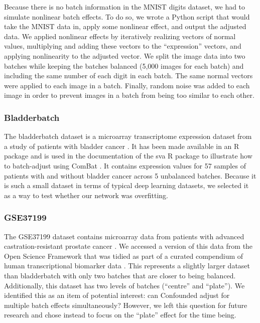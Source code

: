 \documentclass[notitlepage]{article}
\begin{document}
Because there is no batch information in the MNIST digits dataset, we had to simulate nonlinear batch effects.
To do so, we wrote a Python script that would take the MNIST data in, apply some nonlinear effect, and output the adjusted data.
We applied nonlinear effects by iteratively realizing vectors of normal values, multiplying and adding these vectors to the ``expression'' vectors, and applying nonlinearity to the adjusted vector.
We split the image data into two batches while keeping the batches balanced (5,000 images for each batch) and including the same number of each digit in each batch.
The same normal vectors were applied to each image in a batch.
Finally, random noise was added to each image in order to prevent images in a batch from being too similar to each other.

\subsubsection{Bladderbatch}

The bladderbatch dataset is a microarray transcriptome expression dataset from a study of patients with bladder cancer \cite{dyrskjot_gene_2004}.
It has been made available in an R package \cite{leek_bladderbatch_2017} and is used in the documentation of the sva R package to illustrate how to batch-adjust using ComBat \cite{leek_sva_2017}.
It contains expression values for 57 samples of patients with and without bladder cancer across 5 unbalanced batches.
Because it is such a small dataset in terms of typical deep learning datasets, we selected it as a way to test whether our network was overfitting.

\subsubsection{GSE37199}

The GSE37199 dataset contains microarray data from patients with advanced castration-resistant prostate cancer \cite{olmos_prognostic_2012}.
We accessed a version of this data from the Open Science Framework that was tidied as part of a curated compendium of human transcriptional biomarker data \cite{golightly_curated_2018}.
This represents a slightly larger dataset than bladderbatch with only two batches that are closer to being balanced.
Additionally, this dataset has two levels of batches (``centre'' and ``plate'').
We identified this as an item of potential interest: can Confounded adjust for multiple batch effects simultaneously?
However, we left this question for future research and chose instead to focus on the ``plate'' effect for the time being.
\end{document}
